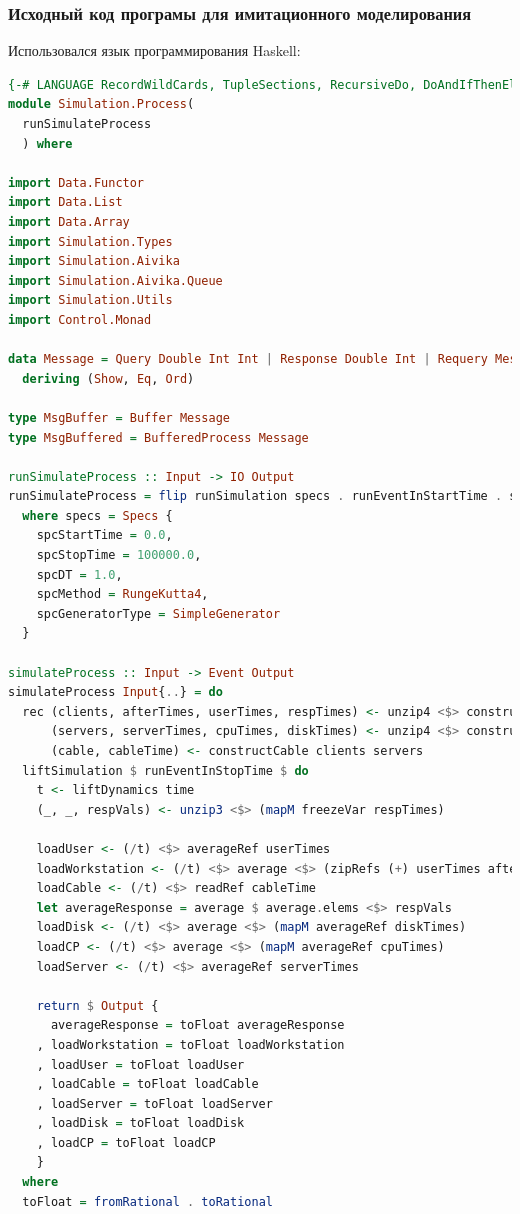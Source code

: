 \documentclass[russian,utf8,emptystyle]{eskdtext}
\begin{document}
\subsubsection{Исходный код програмы для имитационного моделирования}
Использовался язык программирования Haskell:
\begin{lstlisting}[language=Haskell]
{-# LANGUAGE RecordWildCards, TupleSections, RecursiveDo, DoAndIfThenElse #-}
module Simulation.Process(
  runSimulateProcess
  ) where
  
import Data.Functor
import Data.List
import Data.Array
import Simulation.Types
import Simulation.Aivika
import Simulation.Aivika.Queue
import Simulation.Utils
import Control.Monad

data Message = Query Double Int Int | Response Double Int | Requery Message
  deriving (Show, Eq, Ord)
  
type MsgBuffer = Buffer Message
type MsgBuffered = BufferedProcess Message

runSimulateProcess :: Input -> IO Output
runSimulateProcess = flip runSimulation specs . runEventInStartTime . simulateProcess
  where specs = Specs {
    spcStartTime = 0.0,
    spcStopTime = 100000.0,
    spcDT = 1.0,
    spcMethod = RungeKutta4,
    spcGeneratorType = SimpleGenerator 
  }
  
simulateProcess :: Input -> Event Output
simulateProcess Input{..} = do
  rec (clients, afterTimes, userTimes, respTimes) <- unzip4 <$> constructClients cable
      (servers, serverTimes, cpuTimes, diskTimes) <- unzip4 <$> constructServers cable
      (cable, cableTime) <- constructCable clients servers
  liftSimulation $ runEventInStopTime $ do
    t <- liftDynamics time 
    (_, _, respVals) <- unzip3 <$> (mapM freezeVar respTimes)
    
    loadUser <- (/t) <$> averageRef userTimes
    loadWorkstation <- (/t) <$> average <$> (zipRefs (+) userTimes afterTimes)
    loadCable <- (/t) <$> readRef cableTime    
    let averageResponse = average $ average.elems <$> respVals
    loadDisk <- (/t) <$> average <$> (mapM averageRef diskTimes)
    loadCP <- (/t) <$> average <$> (mapM averageRef cpuTimes)
    loadServer <- (/t) <$> averageRef serverTimes
    
    return $ Output {
      averageResponse = toFloat averageResponse
    , loadWorkstation = toFloat loadWorkstation
    , loadUser = toFloat loadUser
    , loadCable = toFloat loadCable
    , loadServer = toFloat loadServer
    , loadDisk = toFloat loadDisk
    , loadCP = toFloat loadCP
    }
  where
  toFloat = fromRational . toRational
  

\end{lstlisting}
\end{document}
